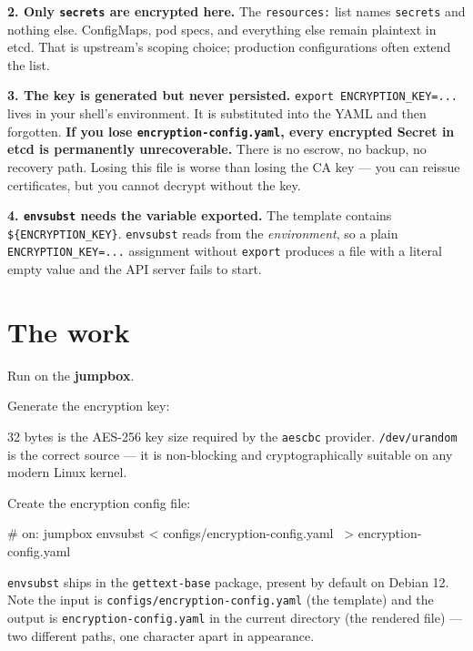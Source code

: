\documentclass[11pt,oneside]{report}
\begin{document}
\textbf{2. Only
\texttt{secrets} are
encrypted here.} The
\texttt{resources:}
list names
\texttt{secrets} and
nothing else.
ConfigMaps, pod
specs, and
everything else
remain plaintext in
etcd. That is
upstream's scoping
choice; production
configurations often
extend the list.

\textbf{3. The key
is generated but
never persisted.}
\texttt{export\ ENCRYPTION\_KEY=.}\allowbreak{}\texttt{.}\allowbreak{}\texttt{.}\allowbreak{}
lives in your
shell's environment.
It is substituted
into the YAML and
then forgotten.
\textbf{If you lose
\texttt{encryption-}\allowbreak{}\texttt{config.}\allowbreak{}\texttt{yaml},
every encrypted
Secret in etcd is
permanently
unrecoverable.}
There is no escrow,
no backup, no
recovery path.
Losing this file is
worse than losing
the CA key --- you
can reissue
certificates, but
you cannot decrypt
without the key.

\textbf{4.
\texttt{envsubst}
needs the variable
exported.} The
template contains
\texttt{\$\{ENCRYPTION\_KEY\}}.
\texttt{envsubst}
reads from the
\emph{environment},
so a plain
\texttt{ENCRYPTION\_KEY=.}\allowbreak{}\texttt{.}\allowbreak{}\texttt{.}\allowbreak{}
assignment without
\texttt{export}
produces a file with
a literal empty
value and the API
server fails to
start.

\hypertarget{the-work-5}{%
\section{The
work}\label{the-work-5}}

Run on the
\textbf{jumpbox}.

Generate the
encryption key:


32 bytes is the
AES-256 key size
required by the
\texttt{aescbc}
provider.
\texttt{/dev/urandom}
is the correct
source --- it is
non-blocking and
cryptographically
suitable on any
modern Linux kernel.

Create the
encryption config
file:

\begin{cmdlst}
# on: jumpbox
envsubst < configs/encryption-config.yaml \
  > encryption-config.yaml
\end{cmdlst}

\texttt{envsubst}
ships in the
\texttt{gettext-base}
package, present by
default on Debian
12. Note the input
is
\texttt{configs/}\allowbreak{}\texttt{encryption-}\allowbreak{}\texttt{config.}\allowbreak{}\texttt{yaml}
(the template) and
the output is
\texttt{encryption-}\allowbreak{}\texttt{config.}\allowbreak{}\texttt{yaml}
in the current
directory (the
rendered file) ---
two different paths,
one character apart
in appearance.
\end{document}

